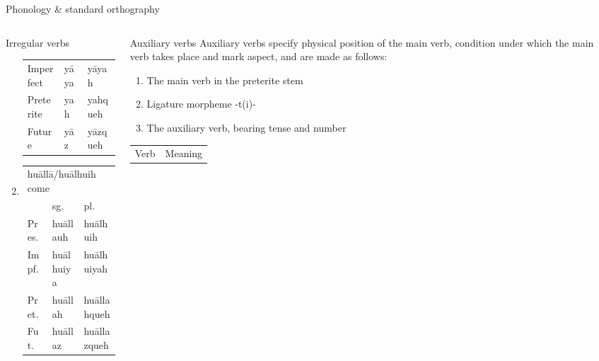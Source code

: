 \documentclass[12pt]{beamer}
\newcommand{\nah}[1]{\textcolor{nahgrn}{#1}}
\newcommand{\trs}[1]{\textcolor{nahblu}{#1}}
\begin{document}
\begin{frame}
\begin{columns}[t]
\begin{column}{.22\linewidth}
\begin{block}{Phonology \& standard orthography}
\begin{threeparttable}
\begin{tablenotes}
\begin{frame}
\begin{frame}
\begin{columns}[t]
\begin{column}{.18\linewidth}
\begin{block}{Irregular verbs}
\begin{enumerate}
\begin{tabular}[t]{lll}
                        Imperfect & \nah{yāya} & \nah{yāyah} \\
                        Preterite & \nah{yah} & \nah{yahqueh} \\
                        Future & \nah{yāz} & \nah{yāzqueh} \\
                      \end{tabular}%
                    \item \begin{tabular}[t]{lll}
                            \multicolumn{3}{l}{\nah{huāllā/huālhuih} \trs{come}} \\
                            & sg.   & pl.\\
                            Pres. & \nah{huāllauh} & \nah{huālhuih} \\
                            Impf. & \nah{huālhuiya} & \nah{huālhuiyah} \\
                            Pret. & \nah{huāllah} & \nah{huāllahqueh} \\
                            Fut. & \nah{huāllaz} & \nah{huāllazqueh} \\
                          \end{tabular}%
                        \end{enumerate}
                      \end{block}
                    \end{column}
                    \begin{column}{.18\linewidth}
                      \begin{block}{Auxiliary verbs}
                        Auxiliary verbs specify physical position of the main verb, condition under which the main verb takes place and mark aspect, and are made as follows:
                        \begin{enumerate}
                        \item The main verb in the preterite stem
                        \item Ligature morpheme \nah{-t(i)-}
                        \item The auxiliary verb, bearing tense and number
                        \end{enumerate}
                        \begin{threeparttable}
                          \begin{tabular}{lll}
                            \multicolumn{1}{c}{Verb}& \multicolumn{2}{c}{Meaning}\\

\end{tabular}
\end{threeparttable}
\end{block}
\end{column}
\end{columns}
\end{frame}
\end{frame}
\end{tablenotes}
\end{threeparttable}
\end{block}
\end{column}
\end{columns}
\end{frame}
\end{document}
